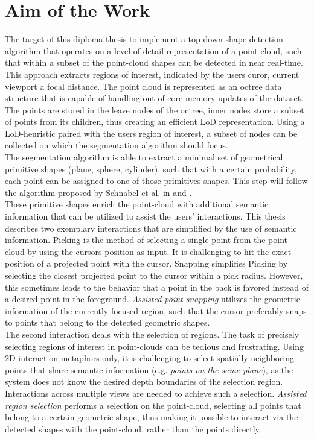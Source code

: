 \section{Aim of the Work}
\label{sec:aim}

The target of this diploma thesis to implement a top-down shape detection algorithm that operates on a level-of-detail representation of a point-cloud, such that within a subset of the point-cloud shapes can be detected in near real-time. 
This approach extracts regions of interest, indicated by the users curor, current viewport a focal distance. The point cloud is represented as an octree data structure that is capable of handling out-of-core memory updates of the dataset. The points are stored in the leave nodes of the octree, inner nodes store a subset of points from its children, thus creating an efficient LoD representation. Using a LoD-heuristic paired with the users region of interest, a subset of nodes can be collected on which the segmentation algorithm should focus. 
\\
The segmentation algorithm is able to extract a minimal set of geometrical primitive shapes (plane, sphere, cylinder), such that with a certain probability, each point can be assigned to one of those primitives shapes. This step will follow the algorithm proposed by Schnabel et al. in \cite{schnabel-2007-efficient} and \cite{schnabel-2007-ransac}. 
\\
These primitive shapes enrich the point-cloud with additional semantic information that can be utilized to assist the users' interactions. This thesis describes two exemplary interactions that are simplified by the use of semantic information. 
Picking is the method of selecting a single point from the point-cloud by using the cursors position as input. It is challenging to hit the exact position of a projected point with the cursor. Snapping simplifies Picking by selecting the closest projected point to the cursor within a pick radius. However, this sometimes leads to the behavior that a point in the back is favored instead of a desired point in the foreground. \textit{Assisted point snapping} utilizes the geometric information of the currently focused region, such that the cursor preferably snaps to points that belong to the detected geometric shapes. 
\\
The second interaction deals with the selection of regions. The task of precisely selecting regions of interest in point-clouds can be tedious and frustrating. Using 2D-interaction metaphors only, it is challenging to select spatially neighboring points that share semantic information (e.g. \textit{points on the same plane}), as the system does not know the desired depth boundaries of the selection region. Interactions across multiple views are needed to achieve such a selection. \textit{Assisted region selection} performs a selection on the point-cloud, selecting all points that belong to a certain geometric shape, thus making it possible to interact via the detected shapes with the point-cloud, rather than the points directly. 